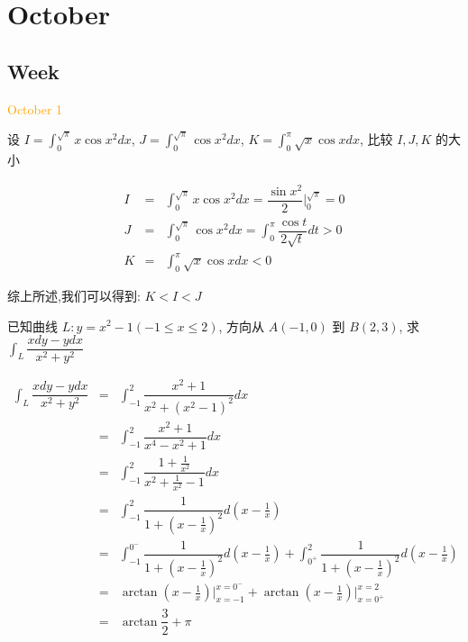 \chapter{October}
\section{Week }
\textcolor{orange}{October 1}

\begin{example}[][Exam: 36.1.1]
	设 $\displaystyle{I=\int_{0}^{\sqrt{\pi}}x\cos x^2dx}$,
$\displaystyle{J=\int_{0}^{\sqrt{\pi}}\cos x^2dx}$,
$\displaystyle{K=\int_{0}^{\pi}\sqrt{x}\cos xdx}$, 比较 $I,J,K$ 的大小
\end{example}

\begin{solution}

	\begin{eqnarray*}
		I & = & \int_{0}^{\sqrt{\pi}}x\cos x^2dx=\dfrac{\sin x^2}{2}|_{0}^{\sqrt{\pi}}=0 \\
		J & = & \int_{0}^{\sqrt{\pi}}\cos x^2dx=\int_{0}^{\pi}\dfrac{\cos t}{2\sqrt{t}}dt>0 \\
	    K & = & \int_{0}^{\pi}\sqrt{x}\cos xdx<0
	\end{eqnarray*}

	综上所述,我们可以得到: $ K < I < J$
\end{solution}

\begin{example}[][Exam: 36.1.2]
	已知曲线 $L: y=x^2-1(-1\leq x\leq 2)$, 方向从 $A(-1,0)$ 到 $B(2,3)$,
求 $\displaystyle{\int_{L}\dfrac{xdy-ydx}{x^2+y^2}}$
\end{example}

\begin{solution}

	\begin{eqnarray*}
		\int_{L}\dfrac{xdy-ydx}{x^2+y^2}
		& = & \int_{-1}^{2}\dfrac{x^2+1}{x^2+(x^2-1)^2}dx\\
		& = & \int_{-1}^{2}\dfrac{x^2+1}{x^4-x^2+1}dx\\
		& = & \int_{-1}^{2}\dfrac{1+\frac{1}{x^2}}{x^2+\frac{1}{x^2}-1}dx\\
		& = & \int_{-1}^{2}\dfrac{1}{1+(x-\frac{1}{x})^2}d(x-\frac{1}{x})\\
		& = & \int_{-1}^{0^{-}}\dfrac{1}{1+(x-\frac{1}{x})^2}d(x-\frac{1}{x})+\int_{0^{+}}^{2}\dfrac{1}{1+(x-\frac{1}{x})^2}d(x-\frac{1}{x})\\
		& = & \arctan(x-\frac{1}{x})\big|_{x=-1}^{x=0^{-}}+\arctan(x-\frac{1}{x})\big|_{x=0^{+}}^{x=2}\\
		& = & \arctan\dfrac{3}{2}+\pi
	\end{eqnarray*}
\end{solution}


